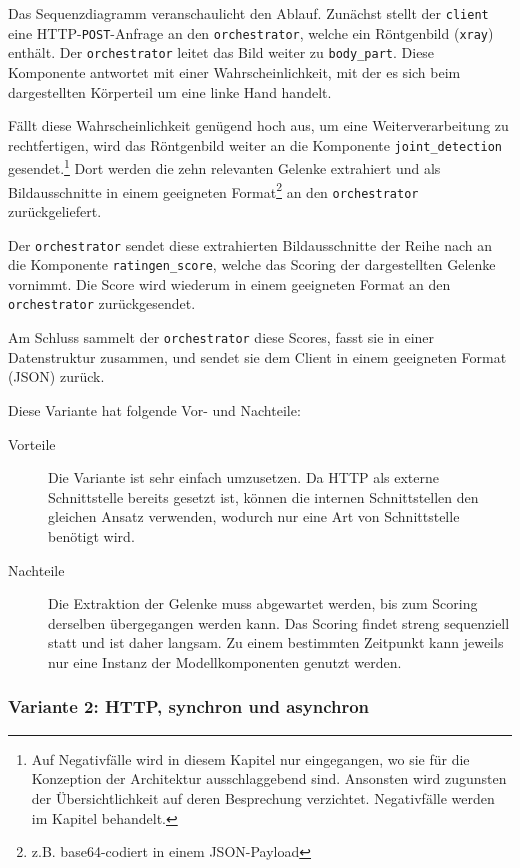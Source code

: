 Das Sequenzdiagramm  veranschaulicht den Ablauf. Zunächst stellt der \texttt{client} eine HTTP-\texttt{POST}-Anfrage an den \texttt{orchestrator}, welche ein Röntgenbild (\texttt{xray}) enthält. Der \texttt{orchestrator} leitet das Bild weiter zu \texttt{body\_part}. Diese Komponente antwortet mit einer Wahrscheinlichkeit, mit der es sich beim dargestellten Körperteil um eine linke Hand handelt.

Fällt diese Wahrscheinlichkeit genügend hoch aus, um eine Weiterverarbeitung zu rechtfertigen, wird das Röntgenbild weiter an die Komponente \texttt{joint\_detection} gesendet.\footnote{Auf Negativfälle wird in diesem Kapitel nur eingegangen, wo sie für die Konzeption der Architektur ausschlaggebend sind. Ansonsten wird zugunsten der Übersichtlichkeit auf deren Besprechung verzichtet. Negativfälle werden im Kapitel  behandelt.} Dort werden die zehn relevanten Gelenke extrahiert und als Bildausschnitte in einem geeigneten Format\footnote{z.B. base64-codiert in einem JSON-Payload} an den \texttt{orchestrator} zurückgeliefert.

Der \texttt{orchestrator} sendet diese extrahierten Bildausschnitte der Reihe nach an die Komponente \texttt{ratingen\_score}, welche das Scoring der dargestellten Gelenke vornimmt. Die Score wird wiederum in einem geeigneten Format an den \texttt{orchestrator} zurückgesendet.

Am Schluss sammelt der \texttt{orchestrator} diese Scores, fasst sie in einer Datenstruktur zusammen, und sendet sie dem Client in einem geeigneten Format (JSON) zurück.

Diese Variante hat folgende Vor- und Nachteile:

\begin{description}
    \item[Vorteile] Die Variante ist sehr einfach umzusetzen. Da HTTP als externe Schnittstelle bereits gesetzt ist, können die internen Schnittstellen den gleichen Ansatz verwenden, wodurch nur eine Art von Schnittstelle benötigt wird.
    \item[Nachteile] Die Extraktion der Gelenke muss abgewartet werden, bis zum Scoring derselben übergegangen werden kann. Das Scoring findet streng sequenziell statt und ist daher langsam. Zu einem bestimmten Zeitpunkt kann jeweils nur eine Instanz der Modellkomponenten genutzt werden.
\end{description}

\subsubsection{Variante 2: HTTP, synchron und asynchron}

